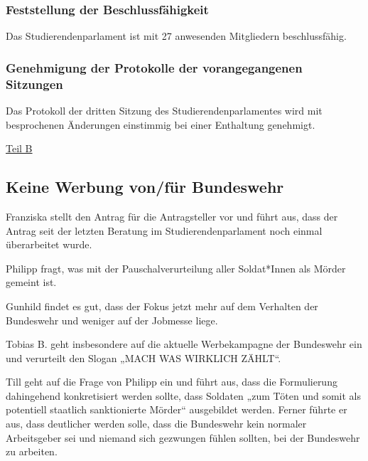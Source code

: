 \documentclass[ngerman,headheight=70pt]{scrartcl}
\begin{document}
    \subsubsection{Feststellung der Beschlussfähigkeit}

    Das Studierendenparlament ist mit 27 anwesenden Mitgliedern beschlussfähig.

    \subsubsection{Genehmigung der Protokolle der vorangegangenen Sitzungen}

    Das Protokoll der dritten Sitzung des Studierendenparlamentes wird mit
    besprochenen Änderungen einstimmig bei einer Enthaltung genehmigt.

    \newpage
    {\Large \underline{Teil B}}


    \subsection{Keine Werbung von/für Bundeswehr}

    Franziska stellt den Antrag für die Antragsteller vor und führt aus, dass der
    Antrag seit der letzten Beratung im Studierendenparlament noch einmal
    überarbeitet wurde.

    Philipp fragt, was mit der Pauschalverurteilung aller Soldat*Innen als Mörder
    gemeint ist.

    Gunhild findet es gut, dass der Fokus jetzt mehr auf dem Verhalten der Bundeswehr
    und weniger auf der Jobmesse liege.

    Tobias B. geht insbesondere auf die aktuelle Werbekampagne der Bundeswehr ein
    und verurteilt den Slogan „MACH WAS WIRKLICH ZÄHLT“.

    Till geht auf die Frage von Philipp ein und führt aus, dass die Formulierung
    dahingehend konkretisiert werden sollte, dass Soldaten „zum Töten und somit
    als potentiell staatlich sanktionierte Mörder“ ausgebildet werden. Ferner
    führte er aus, dass deutlicher werden solle, dass die Bundeswehr kein normaler
    Arbeitsgeber sei und niemand sich gezwungen fühlen sollten, bei der Bundeswehr
    zu arbeiten.
\end{document}
